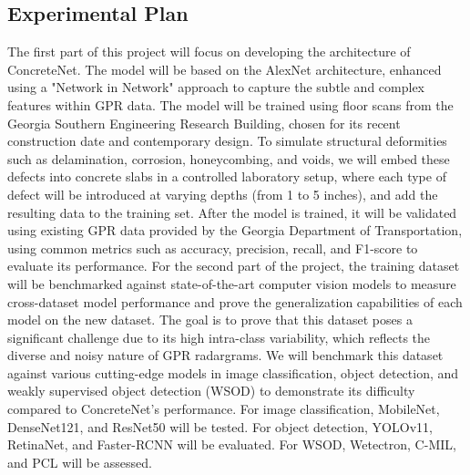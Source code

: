 \documentclass[pra, superscriptaddress]{revtex4-2}
\begin{document}
\subsection{Experimental Plan}

\noindent The first part of this project will focus on developing the architecture of ConcreteNet. The model will be based on the AlexNet architecture, enhanced using a "Network in Network" approach to capture the subtle and complex features within GPR data. The model will be trained using floor scans from the Georgia Southern Engineering Research Building, chosen for its recent construction date and contemporary design. To simulate structural deformities such as delamination, corrosion, honeycombing, and voids, we will embed these defects into concrete slabs in a controlled laboratory setup, where each type of defect will be introduced at varying depths (from 1 to 5 inches), and add the resulting data to the training set. After the model is trained, it will be validated using existing GPR data provided by the Georgia Department of Transportation, using common metrics such as accuracy, precision, recall, and F1-score to evaluate its performance. For the second part of the project, the training dataset will be benchmarked against state-of-the-art computer vision models to measure cross-dataset model performance and prove the generalization capabilities of each model on the new dataset. The goal is to prove that this dataset poses a significant challenge due to its high intra-class variability, which reflects the diverse and noisy nature of GPR radargrams. We will benchmark this dataset against various cutting-edge models in image classification, object detection, and weakly supervised object detection (WSOD) to demonstrate its difficulty compared to ConcreteNet's performance. For image classification, MobileNet, DenseNet121, and ResNet50 will be tested. For object detection, YOLOv11, RetinaNet, and Faster-RCNN will be evaluated. For WSOD, Wetectron, C-MIL, and PCL will be assessed.
\end{document}
